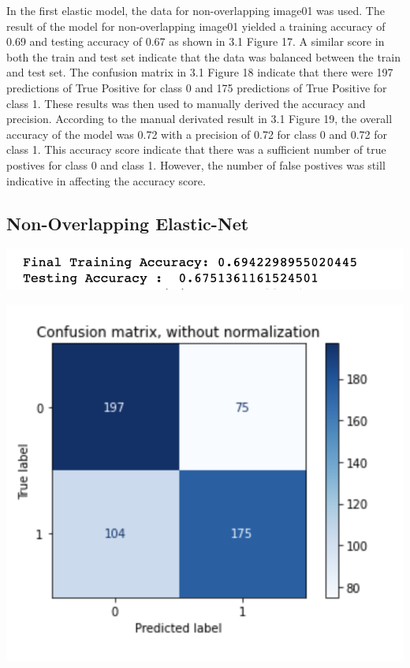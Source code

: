 \documentclass[12pt]{article}
\begin{document}
\begin{multicols*}{2}
  \hspace*{10mm} In the first elastic model, the data for non-overlapping image01 was used. The result of the model for
  non-overlapping image01 yielded a training accuracy of 0.69 and testing accuracy of 0.67 as shown in 3.1 Figure 17. A similar 
  score in both the train and test set indicate that the data was balanced between the train and test set. The confusion matrix in 3.1 
  Figure 18 indicate that there were 197 predictions of True Positive for class 0 and 175 predictions of True Positive for class 1. These
  results was then used to manually derived the accuracy and precision. According to the manual derivated result in 3.1 Figure 19, the overall
  accuracy of the model was 0.72 with a precision of 0.72 for class 0 and 0.72 for class 1. This accuracy score indicate that there was a sufficient
  number of true postives for class 0 and class 1. However, the number of false postives was still indicative in affecting the accuracy score.

  \subsection{Non-Overlapping Elastic-Net} 
  \begin{center}
		\includegraphics[scale=0.5]{../screenshot/Non-Overlapping-Elastic-results/results.png}

		\includegraphics[scale=0.5]{../screenshot/Non-Overlapping-Elastic-results/cf.png}


\end{center}
\end{multicols*}
\end{document}
